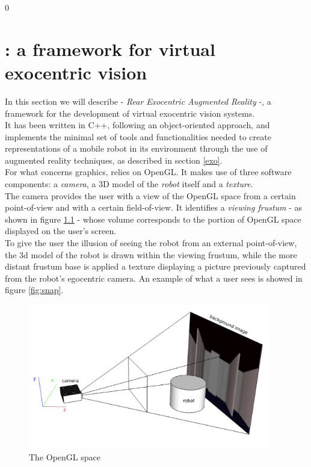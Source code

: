 \setcounter{figure}{0}
\setcounter{table}{0}
\setcounter{lstlisting} {0}

\chapter{\framework{}: a framework for virtual exocentric vision}
\label{rear}
\minitoc

In this section we will describe \framework{} - 
\textit{Rear Exocentric Augmented Reality} -, a framework 
for the development of virtual exocentric vision systems.
\\
It has been written in C++, following an object-oriented 
approach, and implements the minimal set of tools and functionalities 
needed to create representations of a mobile robot in its environment 
through the use of augmented reality techniques, as described in 
section \ref{exo}.
\\
For what concerns graphics, \framework{} relies on OpenGL.
It makes use of three software components: a \textit{camera}, 
a 3D model of the \textit{robot} itself and a \textit{texture}.
\\
The camera provides the user with a view of the OpenGL space 
from a certain point-of-view and with a certain field-of-view. 
It identifies a \textit{viewing frustum} - as shown in figure 
\ref{fig:openglspace} - whose volume corresponds to the 
portion of OpenGL space displayed on the user's screen.
\\
To give the user the illusion of seeing the robot from an 
external point-of-view, the 3d model of the robot is drawn 
within the viewing frustum, while the more distant frustum base 
is applied a texture displaying a picture previously 
captured from the robot's egocentric camera.
An example of what a user sees is showed in figure \ref{fig:snap}.

\begin{figure}[!h]
  \begin{center}
    \includegraphics[width=300pt]{img/camera_frustum_scheme.png}
    \caption{The OpenGL space}
    \label{fig:openglspace}
  \end{center}
\end{figure}

